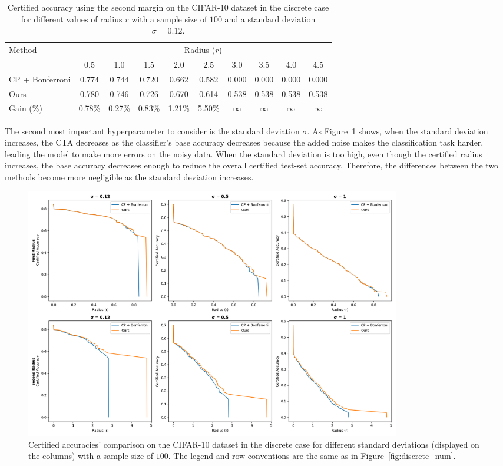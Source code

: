 \begin{table}[htbp]
    \centering
    \caption{Certified accuracy using the second margin on the CIFAR-10 dataset in the discrete case for different values of radius $r$ with a sample size of $100$ and a standard deviation $\sigma = 0.12$.}
    \label{tab:simplified-certified-accuracy}
    \renewcommand{\arraystretch}{1.2}
    \begin{tabular}{l*{9}{c}}
        \toprule
        Method & \multicolumn{9}{c}{Radius ($r$)} \\
        \cmidrule(l){2-10}
        & 0.5 & 1.0 & 1.5 & 2.0 & 2.5 & 3.0 & 3.5 & 4.0 & 4.5 \\
        \midrule
        CP + Bonferroni & 0.774 & 0.744 & 0.720 & 0.662 & 0.582 & 0.000 & 0.000 & 0.000 & 0.000 \\
        Ours              & 0.780 & 0.746 & 0.726 & 0.670 & 0.614 & 0.538 & 0.538 & 0.538 & 0.538 \\
        Gain (\%) & 0.78\% & 0.27\% & 0.83\% & 1.21\% & 5.50\% & $\infty$ & $\infty$ & $\infty$ & $\infty$ \\
        \bottomrule
    \end{tabular}
\end{table}

The second most important hyperparameter to consider is the standard deviation $\sigma$.
As Figure~\ref{fig:discrete_sigma} shows, when the standard deviation increases, the CTA decreases as the classifier’s base accuracy decreases because the added noise makes the classification task harder, leading the model to make more errors on the noisy data.
When the standard deviation is too high, even though the certified radius increases, the base accuracy decreases enough to reduce the overall certified test-set accuracy.
Therefore, the differences between the two methods become more negligible as the standard deviation increases.

\begin{figure}[htbp]
    \centering
    \includegraphics[width=0.8\textwidth]{images/discrete_sigma}
    \caption{Certified accuracies' comparison on the CIFAR-10 dataset in the discrete case for different standard deviations (displayed on the columns) with a sample size of $100$. The legend and row conventions are the same as in Figure~\ref{fig:discrete_num}.}
    \label{fig:discrete_sigma}
\end{figure}

